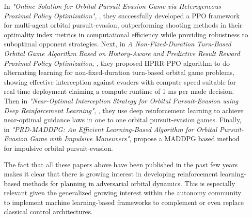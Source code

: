 In \textit{"Online Solution for Orbital Pursuit-Evasion Game via Heterogeneous Proximal Policy Optimization"}, \cite{li2025heterogeneousppo}, they successfully developed a PPO framework for multi-agent orbital pursuit-evasion, outperforming shooting methods in their optimality index metrics in computational efficiency while providing robustness to suboptimal opponent strategies. Next, in \textit{A Non-Fixed-Duration Turn-Based Orbital Game Algorithm Based on History-Aware and Predictive Result Reward Proximal Policy Optimization}, \cite{cao2026historyawareppo}, they proposed HPRR-PPO algorithm to do alternating learning for non-fixed-duration turn-based orbital game problems, showing effective interception against evaders with compute speed suitable for real time deployment claiming a compute runtime of 1 ms per made decision. Then in \textit{"Near-Optimal Interception Strategy for Orbital Pursuit-Evasion using Deep Reinforcement Learning"}, \cite{zhang2022nearoptimal}, they use deep reinforcement learning to achieve near-optimal guidance laws in one to one orbital pursuit-evasion games. Finally, in \textit{"{PRD-MADDPG}: An Efficient Learning-Based Algorithm for Orbital Pursuit-Evasion Game with Impulsive Maneuvers"}, \cite{zhao2023prdmaddpg} propose a MADDPG based method for impulsive orbital pursuit-evasion.

The fact that all these papers above have been published in the past few years makes it clear
that there is growing interest in developing reinforcement learning-based methods for planning in adversarial orbital dynamics. This is especially relevant given the generalized growing interest within the autonomy community to implement machine learning-based frameworks to complement or even replace classical control architectures. 


